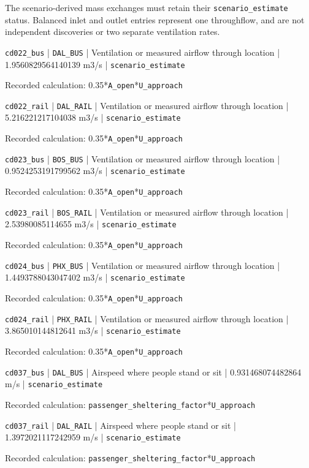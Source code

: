 The scenario-derived mass exchanges must retain their \nolinkurl{scenario_estimate} status. Balanced inlet and outlet entries represent one throughflow, and are not independent discoveries or two separate ventilation rates.

\nolinkurl{cd022_bus} | \nolinkurl{DAL_BUS} | Ventilation or measured airflow through location | 1.9560829564140139 m3/s | \nolinkurl{scenario_estimate}

Recorded calculation: 0.35*\nolinkurl{A_open}*\nolinkurl{U_approach}

\nolinkurl{cd022_rail} | \nolinkurl{DAL_RAIL} | Ventilation or measured airflow through location | 5.216221217104038 m3/s | \nolinkurl{scenario_estimate}

Recorded calculation: 0.35*\nolinkurl{A_open}*\nolinkurl{U_approach}

\nolinkurl{cd023_bus} | \nolinkurl{BOS_BUS} | Ventilation or measured airflow through location | 0.9524253191799562 m3/s | \nolinkurl{scenario_estimate}

Recorded calculation: 0.35*\nolinkurl{A_open}*\nolinkurl{U_approach}

\nolinkurl{cd023_rail} | \nolinkurl{BOS_RAIL} | Ventilation or measured airflow through location | 2.53980085114655 m3/s | \nolinkurl{scenario_estimate}

Recorded calculation: 0.35*\nolinkurl{A_open}*\nolinkurl{U_approach}

\nolinkurl{cd024_bus} | \nolinkurl{PHX_BUS} | Ventilation or measured airflow through location | 1.4493788043047402 m3/s | \nolinkurl{scenario_estimate}

Recorded calculation: 0.35*\nolinkurl{A_open}*\nolinkurl{U_approach}

\nolinkurl{cd024_rail} | \nolinkurl{PHX_RAIL} | Ventilation or measured airflow through location | 3.865010144812641 m3/s | \nolinkurl{scenario_estimate}

Recorded calculation: 0.35*\nolinkurl{A_open}*\nolinkurl{U_approach}

\nolinkurl{cd037_bus} | \nolinkurl{DAL_BUS} | Airspeed where people stand or sit | 0.931468074482864 m/s | \nolinkurl{scenario_estimate}

Recorded calculation: \nolinkurl{passenger_sheltering_factor}*\nolinkurl{U_approach}

\nolinkurl{cd037_rail} | \nolinkurl{DAL_RAIL} | Airspeed where people stand or sit | 1.3972021117242959 m/s | \nolinkurl{scenario_estimate}

Recorded calculation: \nolinkurl{passenger_sheltering_factor}*\nolinkurl{U_approach}

